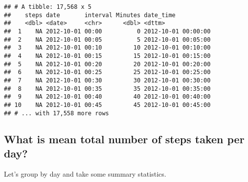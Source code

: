 \documentclass[]{article}
\newenvironment{Shaded}{\begin{snugshade}}{\end{snugshade}}
\newcommand{\KeywordTok}[1]{\textcolor[rgb]{0.13,0.29,0.53}{\textbf{#1}}}
\newcommand{\DataTypeTok}[1]{\textcolor[rgb]{0.13,0.29,0.53}{#1}}
\newcommand{\DecValTok}[1]{\textcolor[rgb]{0.00,0.00,0.81}{#1}}
\newcommand{\StringTok}[1]{\textcolor[rgb]{0.31,0.60,0.02}{#1}}
\newcommand{\CommentTok}[1]{\textcolor[rgb]{0.56,0.35,0.01}{\textit{#1}}}
\newcommand{\OtherTok}[1]{\textcolor[rgb]{0.56,0.35,0.01}{#1}}
\newcommand{\OperatorTok}[1]{\textcolor[rgb]{0.81,0.36,0.00}{\textbf{#1}}}
\newcommand{\NormalTok}[1]{#1}
\begin{document}
\begin{verbatim}
## # A tibble: 17,568 x 5
##    steps date       interval Minutes date_time          
##    <dbl> <date>     <chr>      <dbl> <dttm>             
##  1    NA 2012-10-01 00:00          0 2012-10-01 00:00:00
##  2    NA 2012-10-01 00:05          5 2012-10-01 00:05:00
##  3    NA 2012-10-01 00:10         10 2012-10-01 00:10:00
##  4    NA 2012-10-01 00:15         15 2012-10-01 00:15:00
##  5    NA 2012-10-01 00:20         20 2012-10-01 00:20:00
##  6    NA 2012-10-01 00:25         25 2012-10-01 00:25:00
##  7    NA 2012-10-01 00:30         30 2012-10-01 00:30:00
##  8    NA 2012-10-01 00:35         35 2012-10-01 00:35:00
##  9    NA 2012-10-01 00:40         40 2012-10-01 00:40:00
## 10    NA 2012-10-01 00:45         45 2012-10-01 00:45:00
## # ... with 17,558 more rows
\end{verbatim}

\subsection{What is mean total number of steps taken per
day?}\label{what-is-mean-total-number-of-steps-taken-per-day}

Let's group by day and take some summary statistics.

\begin{Shaded}
\end{Shaded}
\end{document}
